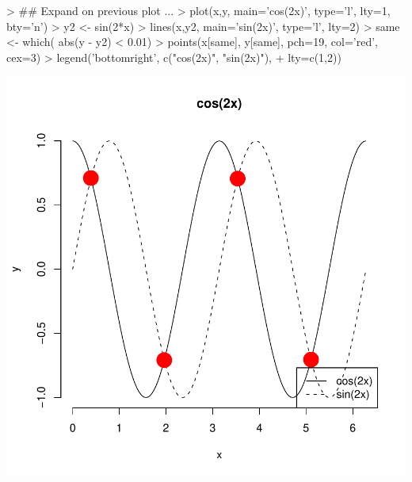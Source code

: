 \documentclass[10pt,letterpaper]{article}
\newenvironment{Schunk}{}{}
\begin{document}
\begin{center}
\begin{Schunk}
\begin{Sinput}
> ## Expand on previous plot ...
> plot(x,y, main='cos(2x)', type='l', lty=1, bty='n')
> y2 <- sin(2*x)
> lines(x,y2, main='sin(2x)', type='l', lty=2)
> same <- which( abs(y - y2) < 0.01)
> points(x[same], y[same], pch=19, col='red', cex=3)
> legend('bottomright', c("cos(2x)", "sin(2x)"),
+        lty=c(1,2))
\end{Sinput}
\end{Schunk}
\includegraphics{Lab0-plotting_2}
\end{center}




\end{document}
